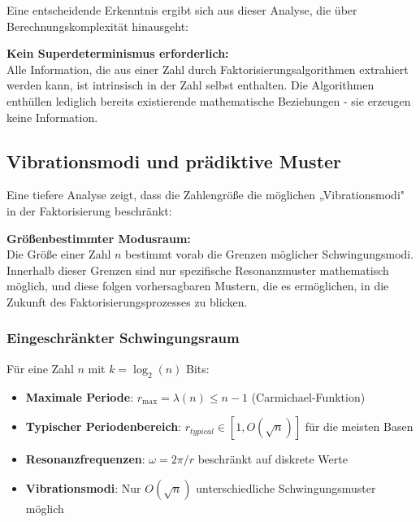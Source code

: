 \documentclass[12pt,a4paper]{article}
\begin{document}
	Eine entscheidende Erkenntnis ergibt sich aus dieser Analyse, die über Berechnungskomplexität hinausgeht:
	
	\begin{tcolorbox}[colback=blue!10,colframe=blue!50,title=Fundamentales Prinzip]
		\textbf{Kein Superdeterminismus erforderlich:} \\
		Alle Information, die aus einer Zahl durch Faktorisierungsalgorithmen extrahiert werden kann, ist intrinsisch in der Zahl selbst enthalten. Die Algorithmen enthüllen lediglich bereits existierende mathematische Beziehungen - sie erzeugen keine Information.
	\end{tcolorbox}
	
	\subsection{Vibrationsmodi und prädiktive Muster}
	
	Eine tiefere Analyse zeigt, dass die Zahlengröße die möglichen „Vibrationsmodi" in der Faktorisierung beschränkt:
	
	\begin{tcolorbox}[colback=purple!10,colframe=purple!50,title=Vibrationseinschränkungsprinzip]
		\textbf{Größenbestimmter Modusraum:} \\
		Die Größe einer Zahl $n$ bestimmt vorab die Grenzen möglicher Schwingungsmodi. Innerhalb dieser Grenzen sind nur spezifische Resonanzmuster mathematisch möglich, und diese folgen vorhersagbaren Mustern, die es ermöglichen, in die Zukunft des Faktorisierungsprozesses zu blicken.
	\end{tcolorbox}
	
	\subsubsection{Eingeschränkter Schwingungsraum}
	
	Für eine Zahl $n$ mit $k = \log_2(n)$ Bits:
	
	\begin{itemize}
		\item \textbf{Maximale Periode}: $r_{\max} = \lambda(n) \leq n-1$ (Carmichael-Funktion)
		\item \textbf{Typischer Periodenbereich}: $r_{typical} \in [1, O(\sqrt{n})]$ für die meisten Basen
		\item \textbf{Resonanzfrequenzen}: $\omega = 2\pi/r$ beschränkt auf diskrete Werte
		\item \textbf{Vibrationsmodi}: Nur $O(\sqrt{n})$ unterschiedliche Schwingungsmuster möglich
	\end{itemize}
	
\end{document}
